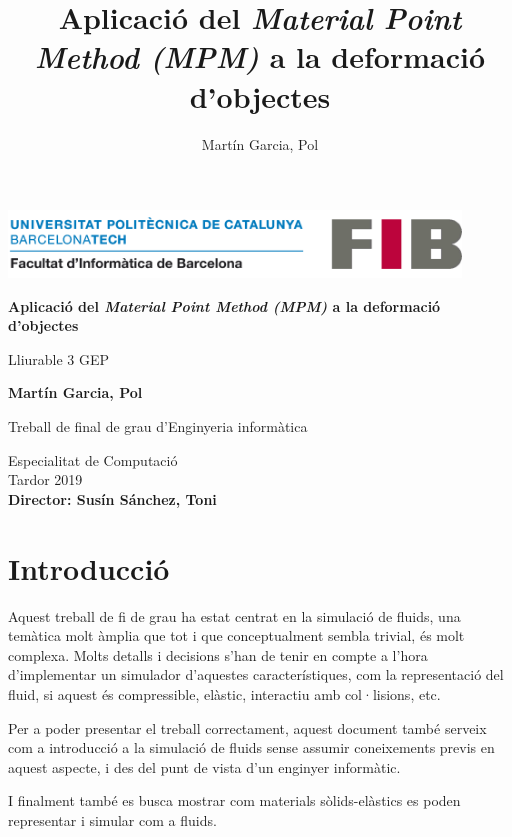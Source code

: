 \documentclass[a4paper]{report}
\title{Aplicació del \textit{Material Point Method (MPM)} a la deformació d'objectes}
\author{Martín Garcia, Pol}
\date{\parbox{\linewidth}{\centering%
		2019, Quadrimestre de tardor\endgraf\bigskip
		Director: Susín Sánchez, Toni\endgraf \medskip
		Especialitat Computació \endgraf
}}
\begin{document}

\begin{titlepage}
	
	\begin{center}


	
		\includegraphics[width=12cm]{images/logo-fib.png} %
	\vfill
	
	\Huge
	\textbf{Aplicació del \textit{Material Point Method (MPM)} a la deformació d'objectes}  
	
	\vspace{0.5cm}
	\LARGE
	Lliurable 3 GEP

	\vspace{1.5cm}
	
	\textbf{Martín Garcia, Pol}

	\vfill
	
	Treball de final de grau d'Enginyeria informàtica
	
	\vspace{0.8cm}
	
	\Large
	Especialitat de Computació \\
	Tardor 2019 \\
	\vspace{0.5cm}
\textbf{Director: Susín Sánchez, Toni}
	\end{center}
\end{titlepage}


	\newpage
	

	\renewcommand{\contentsname}{Índex}
	\renewcommand{\cftsecfont}{\normalfont\bfseries}
	
	\tableofcontents
	\newpage
	
	\setcounter{page}{2}


	\chapter{Introducció}
	Aquest treball de fi de grau ha estat centrat en la simulació de fluids, una temàtica molt àmplia que tot i que conceptualment sembla trivial, és molt complexa. Molts detalls i decisions s'han de tenir en compte a l'hora d'implementar un simulador d'aquestes característiques, com la representació del fluid, si aquest és compressible, elàstic, interactiu amb col·lisions, etc. \par
	Per a poder presentar el treball correctament, aquest document també serveix com a introducció a la simulació de fluids sense assumir coneixements previs en aquest aspecte, i des del punt de vista d'un enginyer informàtic.\par
	I finalment també es busca mostrar com materials sòlids-elàstics es poden representar i simular com a fluids.
\end{document}

